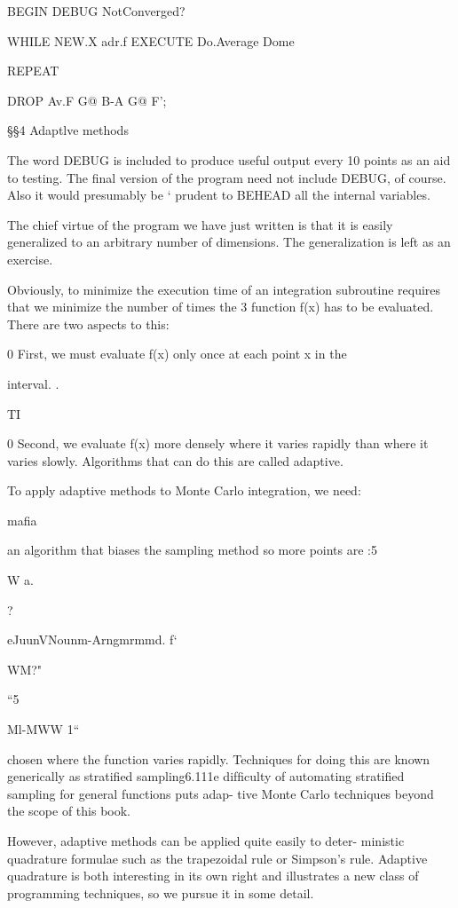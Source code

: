 BEGIN DEBUG NotConverged?

WHILE NEW.X adr.f EXECUTE
Do.Average Dome

REPEAT

DROP Av.F G@ B-A G@ F';

§§4 Adaptlve methods

The word DEBUG is included to produce useful output every 10
points as an aid to testing. The ﬁnal version of the program need
not include DEBUG, of course. Also it would presumably be ‘
prudent to BEHEAD all the internal variables.

The chief virtue of the program we have just written is that it is
easily generalized to an arbitrary number of dimensions. The
generalization is left as an exercise.

Obviously, to minimize the execution time of an integration
subroutine requires that we minimize the number of times the 3
function f(x) has to be evaluated. There are two aspects to this:

0 First, we must evaluate f(x) only once at each point x in the

interval. .

TI

0 Second, we evaluate f(x) more densely where it varies rapidly
than where it varies slowly. Algorithms that can do this are
called adaptive.

To apply adaptive methods to Monte Carlo integration, we need:

mafia

 

an algorithm that biases the sampling method so more points are :5

W
a.

?

eJuunVNounm-Arngmrmmd. f‘

WM?"

“5

Ml-MWW 1“

chosen where the function varies rapidly. Techniques for doing
this are known generically as stratified sampling6.111e difﬁculty
of automating stratiﬁed sampling for general functions puts adap-
tive Monte Carlo techniques beyond the scope of this book.

However, adaptive methods can be applied quite easily to deter-
ministic quadrature formulae such as the trapezoidal rule or
Simpson’s rule. Adaptive quadrature is both interesting in its own
right and illustrates a new class of programming techniques, so
we pursue it in some detail.


